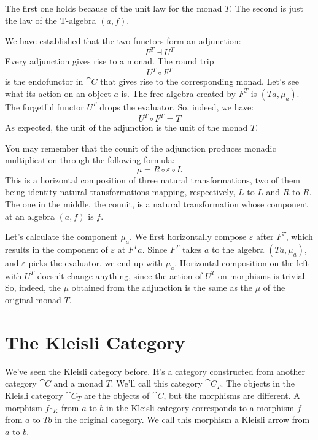 \noindent
The first one holds because of the unit law for the monad $T$.
The second is just the law of the T-algebra $(a, f)$.

We have established that the two functors form an adjunction:
\[F^T \dashv U^T\]
Every adjunction gives rise to a monad. The round trip
\[U^T \circ F^T\]
is the endofunctor in $\cat{C}$ that gives rise to the corresponding monad.
Let's see what its action on an object $a$ is. The free algebra
created by $F^T$ is $(T a, \mu_a)$. The forgetful functor
$U^T$ drops the evaluator. So, indeed, we have:
\[U^T \circ F^T = T\]
As expected, the unit of the adjunction is the unit of the monad $T$.

You may remember that the counit of the adjunction produces monadic
multiplication through the following formula:
\[\mu = R \circ \varepsilon \circ L\]
This is a horizontal composition of three natural transformations, two
of them being identity natural transformations mapping, respectively,
$L$ to $L$ and $R$ to $R$. The one in the
middle, the counit, is a natural transformation whose component at an
algebra $(a, f)$ is $f$.

Let's calculate the component $\mu_a$. We first horizontally compose
$\varepsilon$ after $F^T$, which results in the component of
$\varepsilon$ at $F^T a$. Since $F^T$ takes $a$ to the
algebra $(T a, \mu_a)$, and $\varepsilon$ picks the evaluator, we end
up with $\mu_a$. Horizontal composition on the left with $U^T$
doesn't change anything, since the action of $U^T$ on morphisms is
trivial. So, indeed, the $\mu$ obtained from the adjunction is the
same as the $\mu$ of the original monad $T$.

\section{The Kleisli Category}

We've seen the Kleisli category before. It's a category constructed from
another category $\cat{C}$ and a monad $T$. We'll call this
category $\cat{C}_T$. The objects in the Kleisli category
$\cat{C}_T$ are the objects of $\cat{C}$, but the morphisms
are different. A morphism $f_{\cat{K}}$ from $a$ to $b$ in
the Kleisli category corresponds to a morphism $f$ from
$a$ to $T b$ in the original category. We call this
morphism a Kleisli arrow from $a$ to $b$.

